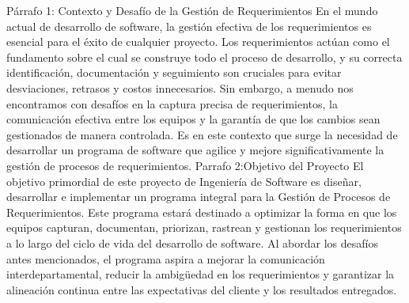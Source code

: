Párrafo 1: Contexto y Desafío de la Gestión de Requerimientos
En el mundo actual de desarrollo de software, la gestión efectiva de los requerimientos es esencial para el éxito de cualquier proyecto. Los requerimientos actúan como el fundamento sobre el cual se construye todo el proceso de desarrollo, y su correcta identificación, documentación y seguimiento son cruciales para evitar desviaciones, retrasos y costos innecesarios. Sin embargo, a menudo nos encontramos con desafíos en la captura precisa de requerimientos, la comunicación efectiva entre los equipos y la garantía de que los cambios sean gestionados de manera controlada. Es en este contexto que surge la necesidad de desarrollar un programa de software que agilice y mejore significativamente la gestión de procesos de requerimientos.
Parrafo 2:Objetivo del Proyecto
El objetivo primordial de este proyecto de Ingeniería de Software es diseñar, desarrollar e implementar un programa integral para la Gestión de Procesos de Requerimientos. Este programa estará destinado a optimizar la forma en que los equipos capturan, documentan, priorizan, rastrean y gestionan los requerimientos a lo largo del ciclo de vida del desarrollo de software. Al abordar los desafíos antes mencionados, el programa aspira a mejorar la comunicación interdepartamental, reducir la ambigüedad en los requerimientos y garantizar la alineación continua entre las expectativas del cliente y los resultados entregados.
